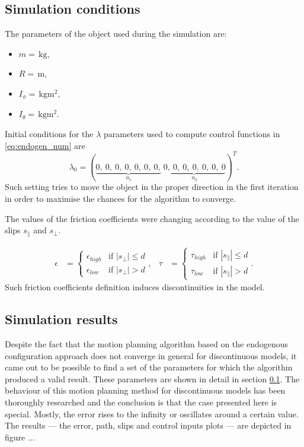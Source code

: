 \subsection{Simulation conditions}
\label{sec:discont_params_uni}
The parameters of the object used during the simulation are:
\begin{multicols}{2}
\begin{itemize}
\item $m= \,\mathrm{kg}$,
\item $R= \,\mathrm{m}$,
\item $I_\phi =\,\mathrm{kgm^2}$,
\item $I_\theta =\,\mathrm{kgm^2}$.
\end{itemize}
\end{multicols}
Initial conditions for the $\lambda$ parameters used to compute control functions
in \eqref{eq:endogen_num} are
\begin{equation}
\lambda_0=
(\underbrace{0, \ 0, \ 0, \ 0, \ 0, \ 0, \ 0,}_{u_1}\ \underbrace{0, \ 0, \ 0, \ 0, \ 0, \ 0, \ 0}_{u_2})^T.
\end{equation}
Such setting tries to move the object in the proper direction in the first iteration in order to
maximise the chances for the algorithm to converge.

The values of the friction coefficients were changing according to the value of the slips $s_\parallel$
and $s_\perp$. 

\begin{equation*}
\begin{aligned}
\epsilon&=\begin{cases}
\epsilon_{high} &\mbox{if } |s_\perp| \leq d \\
\epsilon_{low} &\mbox{if } |s_\perp| > d
\end{cases}, &
\tau&=\begin{cases}
\tau_{high} &\mbox{if } |s_\parallel| \leq d \\
\tau_{low} &\mbox{if } |s_\parallel| > d
\end{cases}.
\end{aligned}
\end{equation*}
Such friction coefficients definition induces discontinuities in the model.

\subsection{Simulation results}
Despite the fact that the motion planning algorithm based on the endogenous 
configuration approach does not converge in general for discontinuous models,
it came out to be possible to find a set of the parameters for which the algorithm produced
a valid result. These parameters are shown in detail in section \ref{sec:discont_params_uni}.
The behaviour of this motion planning method for discontinuous models has been thoroughly researched
and the conclusion is that the case presented here is special. Mostly, the error rises to the infinity
or oscillates around a certain value.
The results --- the error, path, slips and control inputs plots --- are depicted in figure ...


